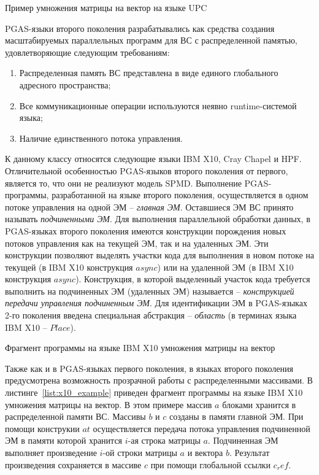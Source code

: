 \begin{ListingEnv}[ht]
	\small {}
    \caption{Пример умножения матрицы на вектор на языке UPC}
    \label{list:upc_example}
\end{ListingEnv}

PGAS-языки второго поколения разрабатывались как средства создания масштабируемых параллельных программ для ВС с распределенной памятью, удовлетворяющие следующим требованиям:
\begin{enumerate}
\item Распределенная память ВС представлена в виде единого глобального адресного пространства;
\item Все коммуникационные операции используются неявно runtime-системой языка;
\item Наличие единственного потока управления.
\end{enumerate}
К данному классу относятся следующие языки IBM X10, Cray Chapel и HPF. Отличительной особенностью PGAS-языков второго поколения от первого, является то, что они не реализуют модель SPMD. Выполнение PGAS-программы, разработанной на языке второго поколения, осуществляется в одном потоке управления на одной ЭМ -- \textit{главная ЭМ}. Оставшиеся ЭМ ВС принято называть \textit{подчиненными ЭМ}. Для выполнения параллельной обработки данных, в PGAS-языках второго поколения имеются конструкции порождения новых потоков управления как на текущей ЭМ, так и на удаленных ЭМ. Эти конструкции позволяют выделять участки кода для выполнения в новом потоке на текущей (в IBM X10 конструкция $async$) или на удаленной ЭМ (в IBM X10 конструкция $async$). Конструкция, в которой выделенный участок кода требуется выполнить на подчиненных ЭМ (удаленных ЭМ) называется -- \textit{конструкцией передачи управления подчиненным ЭМ}. Для идентификации ЭМ в PGAS-языках 2-го поколения введена специальная абстракция -- \textit{область} (в терминах языка IBM X10 -- $Place$).

\begin{ListingEnv}[ht]
	\small {}
    \caption{Фрагмент программы на языке IBM X10 умножения матрицы на вектор}
    \label{list:x10_example}
\end{ListingEnv}

Также как и в PGAS-языках первого поколения, в языках второго поколения предусмотрена возможность прозрачной работы с распределенными массивами. В листинге~\ref{list:x10_example} приведен фрагмент программы на языке IBM X10 умножения матрицы на вектор. В этом примере массив $a$ блоками хранится в распределенной памяти ВС. Массивы $b$ и $c$ созданы в памяти главной ЭМ. При помощи конструкии $at$ осуществляется передача потока управления подчиненной ЭМ в памяти которой хранится $i$-ая строка матрицы $a$. Подчиненная ЭМ выполняет произведение $i$-ой строки матрицы $a$ и вектора $b$. Результат произведения сохраняется в массиве $c$ при помощи глобальной ссылки $c_ref$.

